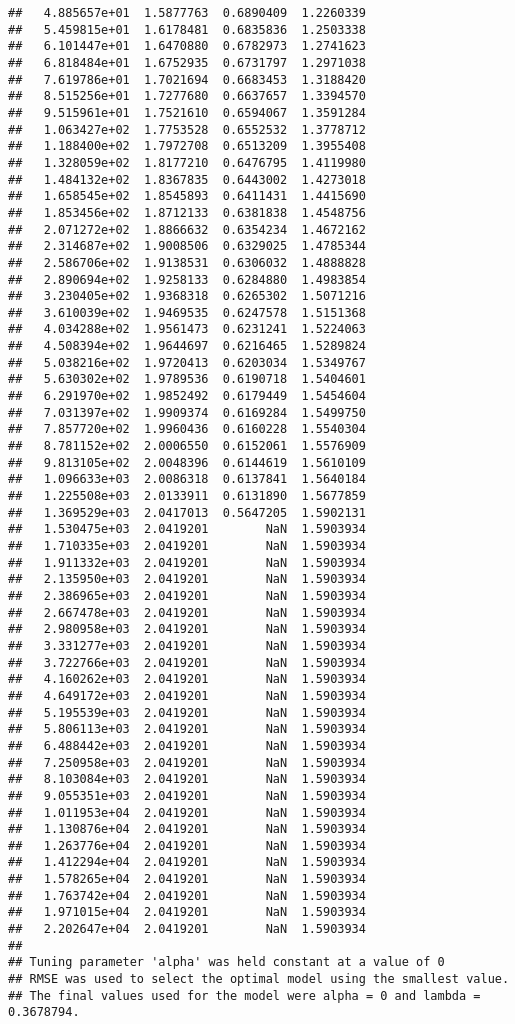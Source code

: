 \documentclass[]{article}
\begin{document}
\begin{verbatim}
##   4.885657e+01  1.5877763  0.6890409  1.2260339
##   5.459815e+01  1.6178481  0.6835836  1.2503338
##   6.101447e+01  1.6470880  0.6782973  1.2741623
##   6.818484e+01  1.6752935  0.6731797  1.2971038
##   7.619786e+01  1.7021694  0.6683453  1.3188420
##   8.515256e+01  1.7277680  0.6637657  1.3394570
##   9.515961e+01  1.7521610  0.6594067  1.3591284
##   1.063427e+02  1.7753528  0.6552532  1.3778712
##   1.188400e+02  1.7972708  0.6513209  1.3955408
##   1.328059e+02  1.8177210  0.6476795  1.4119980
##   1.484132e+02  1.8367835  0.6443002  1.4273018
##   1.658545e+02  1.8545893  0.6411431  1.4415690
##   1.853456e+02  1.8712133  0.6381838  1.4548756
##   2.071272e+02  1.8866632  0.6354234  1.4672162
##   2.314687e+02  1.9008506  0.6329025  1.4785344
##   2.586706e+02  1.9138531  0.6306032  1.4888828
##   2.890694e+02  1.9258133  0.6284880  1.4983854
##   3.230405e+02  1.9368318  0.6265302  1.5071216
##   3.610039e+02  1.9469535  0.6247578  1.5151368
##   4.034288e+02  1.9561473  0.6231241  1.5224063
##   4.508394e+02  1.9644697  0.6216465  1.5289824
##   5.038216e+02  1.9720413  0.6203034  1.5349767
##   5.630302e+02  1.9789536  0.6190718  1.5404601
##   6.291970e+02  1.9852492  0.6179449  1.5454604
##   7.031397e+02  1.9909374  0.6169284  1.5499750
##   7.857720e+02  1.9960436  0.6160228  1.5540304
##   8.781152e+02  2.0006550  0.6152061  1.5576909
##   9.813105e+02  2.0048396  0.6144619  1.5610109
##   1.096633e+03  2.0086318  0.6137841  1.5640184
##   1.225508e+03  2.0133911  0.6131890  1.5677859
##   1.369529e+03  2.0417013  0.5647205  1.5902131
##   1.530475e+03  2.0419201        NaN  1.5903934
##   1.710335e+03  2.0419201        NaN  1.5903934
##   1.911332e+03  2.0419201        NaN  1.5903934
##   2.135950e+03  2.0419201        NaN  1.5903934
##   2.386965e+03  2.0419201        NaN  1.5903934
##   2.667478e+03  2.0419201        NaN  1.5903934
##   2.980958e+03  2.0419201        NaN  1.5903934
##   3.331277e+03  2.0419201        NaN  1.5903934
##   3.722766e+03  2.0419201        NaN  1.5903934
##   4.160262e+03  2.0419201        NaN  1.5903934
##   4.649172e+03  2.0419201        NaN  1.5903934
##   5.195539e+03  2.0419201        NaN  1.5903934
##   5.806113e+03  2.0419201        NaN  1.5903934
##   6.488442e+03  2.0419201        NaN  1.5903934
##   7.250958e+03  2.0419201        NaN  1.5903934
##   8.103084e+03  2.0419201        NaN  1.5903934
##   9.055351e+03  2.0419201        NaN  1.5903934
##   1.011953e+04  2.0419201        NaN  1.5903934
##   1.130876e+04  2.0419201        NaN  1.5903934
##   1.263776e+04  2.0419201        NaN  1.5903934
##   1.412294e+04  2.0419201        NaN  1.5903934
##   1.578265e+04  2.0419201        NaN  1.5903934
##   1.763742e+04  2.0419201        NaN  1.5903934
##   1.971015e+04  2.0419201        NaN  1.5903934
##   2.202647e+04  2.0419201        NaN  1.5903934
## 
## Tuning parameter 'alpha' was held constant at a value of 0
## RMSE was used to select the optimal model using the smallest value.
## The final values used for the model were alpha = 0 and lambda = 0.3678794.
\end{verbatim}
\end{document}
